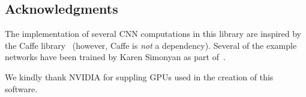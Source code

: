 \documentclass[12pt]{article}
\begin{document}
\subsection{Acknowledgments}\label{s:ack}

The implementation of several CNN computations in this library are inspired by the Caffe library~\cite{jia13caffe} (however, Caffe is \emph{not} a dependency). Several of the example networks have been trained by Karen Simonyan as part of~\cite{chatfield14return}.

We kindly thank NVIDIA for suppling GPUs used in the creation of this software.



\end{document}
